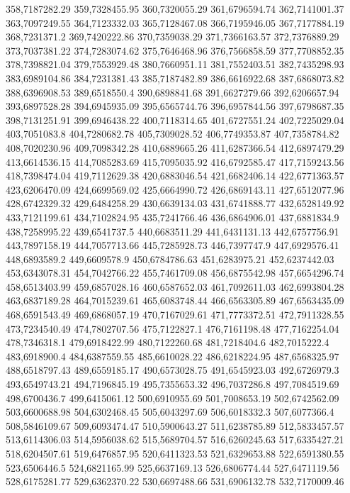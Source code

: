 358,7187282.29
359,7328455.95
360,7320055.29
361,6796594.74
362,7141001.37
363,7097249.55
364,7123332.03
365,7128467.08
366,7195946.05
367,7177884.19
368,7231371.2
369,7420222.86
370,7359038.29
371,7366163.57
372,7376889.29
373,7037381.22
374,7283074.62
375,7646468.96
376,7566858.59
377,7708852.35
378,7398821.04
379,7553929.48
380,7660951.11
381,7552403.51
382,7435298.93
383,6989104.86
384,7231381.43
385,7187482.89
386,6616922.68
387,6868073.82
388,6396908.53
389,6518550.4
390,6898841.68
391,6627279.66
392,6206657.94
393,6897528.28
394,6945935.09
395,6565744.76
396,6957844.56
397,6798687.35
398,7131251.91
399,6946438.22
400,7118314.65
401,6727551.24
402,7225029.04
403,7051083.8
404,7280682.78
405,7309028.52
406,7749353.87
407,7358784.82
408,7020230.96
409,7098342.28
410,6889665.26
411,6287366.54
412,6897479.29
413,6614536.15
414,7085283.69
415,7095035.92
416,6792585.47
417,7159243.56
418,7398474.04
419,7112629.38
420,6883046.54
421,6682406.14
422,6771363.57
423,6206470.09
424,6699569.02
425,6664990.72
426,6869143.11
427,6512077.96
428,6742329.32
429,6484258.29
430,6639134.03
431,6741888.77
432,6528149.92
433,7121199.61
434,7102824.95
435,7241766.46
436,6864906.01
437,6881834.9
438,7258995.22
439,6541737.5
440,6683511.29
441,6431131.13
442,6757756.91
443,7897158.19
444,7057713.66
445,7285928.73
446,7397747.9
447,6929576.41
448,6893589.2
449,6609578.9
450,6784786.63
451,6283975.21
452,6237442.03
453,6343078.31
454,7042766.22
455,7461709.08
456,6875542.98
457,6654296.74
458,6513403.99
459,6857028.16
460,6587652.03
461,7092611.03
462,6993804.28
463,6837189.28
464,7015239.61
465,6083748.44
466,6563305.89
467,6563435.09
468,6591543.49
469,6868057.19
470,7167029.61
471,7773372.51
472,7911328.55
473,7234540.49
474,7802707.56
475,7122827.1
476,7161198.48
477,7162254.04
478,7346318.1
479,6918422.99
480,7122260.68
481,7218404.6
482,7015222.4
483,6918900.4
484,6387559.55
485,6610028.22
486,6218224.95
487,6568325.97
488,6518797.43
489,6559185.17
490,6573028.75
491,6545923.03
492,6726979.3
493,6549743.21
494,7196845.19
495,7355653.32
496,7037286.8
497,7084519.69
498,6700436.7
499,6415061.12
500,6910955.69
501,7008653.19
502,6742562.09
503,6600688.98
504,6302468.45
505,6043297.69
506,6018332.3
507,6077366.4
508,5846109.67
509,6093474.47
510,5900643.27
511,6238785.89
512,5833457.57
513,6114306.03
514,5956038.62
515,5689704.57
516,6260245.63
517,6335427.21
518,6204507.61
519,6476857.95
520,6411323.53
521,6329653.88
522,6591380.55
523,6506446.5
524,6821165.99
525,6637169.13
526,6806774.44
527,6471119.56
528,6175281.77
529,6362370.22
530,6697488.66
531,6906132.78
532,7170009.46
